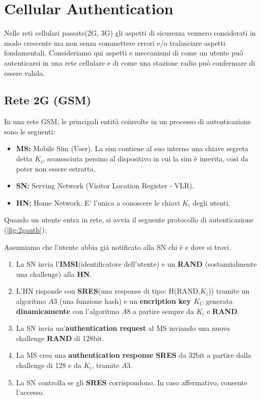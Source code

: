 \chapter{Cellular Authentication}
Nelle reti cellulari passate\footnotemark(2G, 3G) gli aspetti di sicurezza vennero considerati in modo crescente ma non senza commettere errori e/o tralasciare aspetti fondamentali. Consideriamo qui aspetti e meccanismi di come un utente può autenticarsi in una rete cellulare e di come una stazione radio può confermare di essere valida. 
\section{Rete 2G (GSM)}
In una rete GSM, le principali entità coinvolte in un processo di autenticazione sono le seguenti: 
\begin{itemize}
    \item \textbf{MS:} Mobile Sim (User). La sim contiene al suo interno una chiave segreta detta $K_i$\footnotemark, sconosciuta persino al dispositivo in cui la sim è inserita, così da poter non essere estratta.
    \item \textbf{SN:} Serving Network (Visitor Location Register - VLR).
    \item \textbf{HN:} Home Network. E' l'unica a conoscere le chiavi $K_i$ degli utenti.
\end{itemize}
Quando un utente entra in rete, si avvia il seguente protocollo di autenticazione (\cref{fig:2gauth}): 
\begin{proposition}[2G Authentication]\label{prop:2gauth}
Assumiamo che l'utente abbia già notificato alla SN chi è e dove si trovi.
\begin{enumerate}
    \item La SN invia l'\textbf{IMSI}\footnotemark(identificatore dell'utente) e un \textbf{RAND} (sostanzialmente una challenge) alla \textbf{HN}.
    \item L'HN risponde con \textbf{SRES}\footnotemark(una response di tipo: H(RAND,$K_i$)) tramite un algoritmo $A3$ (una funzione hash) e un \textbf{encription key $K_C$} generata \textbf{dinamicamente} con l'algoritmo $A8$ a partire sempre da $K_i$ e \textbf{RAND}.
    \item La SN invia un'\textbf{authentication request} al MS inviando una nuova challenge \textbf{RAND} di 128bit.
    \item La MS crea una \textbf{authentication response} \textbf{SRES} da 32bit a partire dalla challenge di 128 e da $K_i$, tramite $A3$.
    \item La SN controlla se gli \textbf{SRES} corrispondono. In caso affermativo, consente l'accesso.
\end{enumerate}
\end{proposition}
